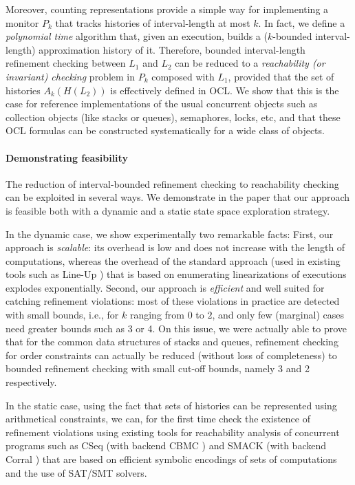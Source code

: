 Moreover, counting representations provide a simple way for implementing a
monitor $P_k$ that tracks histories of interval-length at most $k$. In fact, we define
a \emph{polynomial time} algorithm that, given an execution, builds a
($k$-bounded interval-length) approximation history of it. Therefore, bounded
interval-length refinement checking between $L_1$ and $L_2$ can be reduced to a
\emph{reachability (or invariant) checking} problem in $P_k$ composed with
$L_1$, provided that the set of histories $A_k(H(L_2))$ is effectively defined
in OCL. We show that this is the case for reference implementations of the
usual concurrent objects such as collection objects (like stacks or queues),
semaphores, locks, etc, and that these OCL formulas can be constructed systematically
for a wide class of objects.

\paragraph{Demonstrating feasibility}

The reduction of interval-bounded refinement checking to reachability checking
can be exploited in several ways. We demonstrate in the paper that our approach
is feasible both with a dynamic and a static state space exploration strategy.

In the dynamic case, we show experimentally two remarkable facts: First, our
approach is \emph{scalable}: its overhead is low and does not increase with the
length of computations, whereas the overhead of the standard approach (used in
existing tools such as Line-Up \cite{}) that is based on enumerating
linearizations of executions explodes exponentially. Second, our approach is
\emph{efficient} and well suited for catching refinement violations: most of
these violations in practice are detected with small bounds, i.e., for $k$
ranging from 0 to $2$, and only few (marginal) cases need greater bounds such
as 3 or 4. On this issue, we were actually able to prove that for the common
data structures of stacks and queues, refinement checking for order constraints
can actually be reduced (without loss of completeness) to bounded refinement
checking with small cut-off bounds, namely 3 and 2 respectively.

In the static case, using the fact that sets of histories can be represented
using arithmetical constraints, we can, for the first time check the existence
of refinement violations using existing tools for reachability analysis of
concurrent programs such as CSeq \cite{} (with backend CBMC \cite{}) and SMACK
\cite{} (with backend Corral \cite{}) that are based on efficient symbolic
encodings of sets of computations and the use of SAT/SMT solvers.


